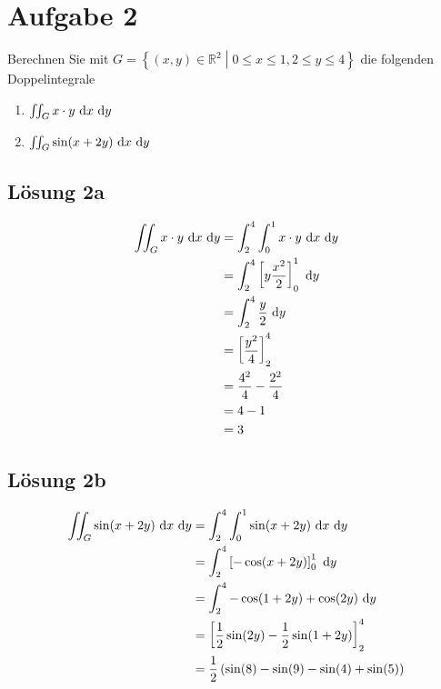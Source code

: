 \documentclass[main.tex]{subfiles}
\begin{document}
\section{Aufgabe 2}
Berechnen Sie mit $G=\left\{(x,y) \in \mathbb{R}^2 \middle| 0 \leq x \leq 1, 2 \leq y \leq 4 \right\}$ die folgenden Doppelintegrale

\begin{enumerate}
    \item $\iint_G x\cdot y ~\mathrm{d}x ~\mathrm{d}y$
    \item $\iint_G \sin (x+2y) ~\mathrm{d}x ~\mathrm{d}y$
\end{enumerate}

\subsection{Lösung 2a}

\begin{align*}
    \iint_G x\cdot y ~\mathrm{d}x ~\mathrm{d}y &= \int_{2}^{4} \int_{0}^{1} x\cdot y ~\mathrm{d}x ~\mathrm{d}y\\
                                   &= \int_{2}^{4} \left[ y\frac{x^2}{2} \right]_{0}^{1} ~\mathrm{d}y\\
                                   &= \int_{2}^{4} \frac{y}{2} ~\mathrm{d}y\\
                                   &= \left[ \frac{y^2}{4} \right]_{2}^{4}\\
                                   &= \frac{4^2}{4} - \frac{2^2}{4}\\
                                   &= 4 - 1\\
                                   &= 3
\end{align*}

\subsection{Lösung 2b}

\begin{align*}
    \iint_G \sin (x+2y) ~\mathrm{d}x~\mathrm{d}y &= \int_{2}^{4} \int_{0}^{1} \sin (x+2y) ~\mathrm{d}x ~\mathrm{d}y\\
                                     &= \int_{2}^{4} \left[ -\cos (x+2y) \right]_{0}^{1} ~\mathrm{d}y\\
                                     &= \int_{2}^{4} -\cos (1+2y) + \cos (2y) ~\mathrm{d}y\\
                                     &= \left[ \frac{1}{2} \sin (2y) - \frac{1}{2} \sin (1+2y) \right]_{2}^{4}\\
                                     &= \frac{1}{2} \left( \sin (8) - \sin (9) - \sin (4) + \sin (5) \right)\\
\end{align*}
\end{document}
